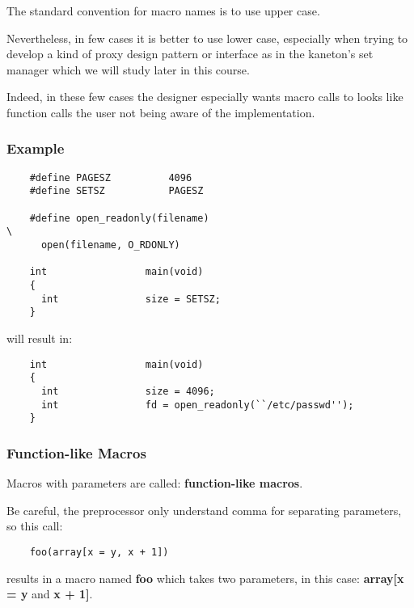 {\begin{frame}
  The standard convention for macro names is to use upper case.

  \nl

  Nevertheless, in few cases it is better to use lower case, especially
  when trying to develop a kind of proxy design pattern or interface as
  in the kaneton's set manager which we will study later in this course.

  \nl

  Indeed, in these few cases the designer especially wants macro calls
  to looks like function calls the user not being aware of the implementation.
\end{frame}


\begin{frame}[containsverbatim]
  \frametitle{Example}

  \begin{verbatim}
    #define PAGESZ          4096
    #define SETSZ           PAGESZ

    #define open_readonly(filename)                                     \
      open(filename, O_RDONLY)

    int                 main(void)
    {
      int               size = SETSZ;
    }
  \end{verbatim}

  will result in:

  \begin{verbatim}
    int                 main(void)
    {
      int               size = 4096;
      int               fd = open_readonly(``/etc/passwd'');
    }
  \end{verbatim}
\end{frame}


\begin{frame}[containsverbatim]
  \frametitle{Function-like Macros}

  Macros with parameters are called: \textbf{function-like macros}.

  \nl

  Be careful, the preprocessor only understand comma for separating parameters,
  so this call:

  \begin{verbatim}
    foo(array[x = y, x + 1])
  \end{verbatim}

  results in a macro named \textbf{foo} which takes two parameters,
  in this case: \textbf{array[x = y} and \textbf{x + 1]}.


\end{frame}}
